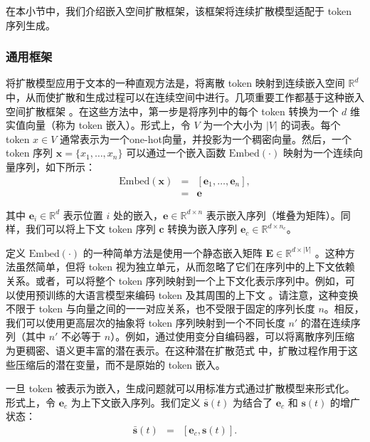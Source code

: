 \documentclass[UTF8,a4paper,zihao=-4,oneside,openany]{ctexbook}
\begin{document}
在本小节中，我们介绍嵌入空间扩散框架，该框架将连续扩散模型适配于 token 序列生成。

\subsubsection{通用框架}

将扩散模型应用于文本的一种直观方法是，将离散 token 映射到连续嵌入空间 $\mathbb{R}^d$ 中，从而使扩散和生成过程可以在连续空间中进行。几项重要工作都基于这种嵌入空间扩散框架 \citep{li-etal:2022diffusion,strudel-etal:2022self,gong-etal:2023diffuseq}。在这些方法中，第一步是将序列中的每个 token 转换为一个 $d$ 维实值向量（称为 token 嵌入）。形式上，令 $V$ 为一个大小为 $|V|$ 的词表。每个 token $x \in V$ 通常表示为一个one-hot向量，并投影为一个稠密向量。然后，一个 token 序列 $\mathbf{x} = \{x_1, \dots, x_n\}$ 可以通过一个嵌入函数 $\mathrm{Embed}(\cdot)$ 映射为一个连续向量序列，如下所示：
\begin{eqnarray}
\mathrm{Embed}(\mathbf{x}) & = & [\mathbf{e}_1,\dots,\mathbf{e}_n], \nonumber \\
& = & \mathbf{e}
\end{eqnarray}

\noindent 其中 $\mathbf{e}_i \in \mathbb{R}^d$ 表示位置 $i$ 处的嵌入，$\mathbf{e} \in \mathbb{R}^{d \times n}$ 表示嵌入序列（堆叠为矩阵）。同样，我们可以将上下文 token 序列 $\mathbf{c}$ 转换为嵌入序列 $\mathbf{e}_{c} \in \mathbb{R}^{d \times n_c}$。

定义 $\mathrm{Embed}(\cdot)$ 的一种简单方法是使用一个静态嵌入矩阵 $\mathbf{E} \in \mathbb{R}^{d \times |V|}$ \citep{mikolov-etal:2013efficient,mikolov-etal:2013distributed}。这种方法虽然简单，但将 token 视为独立单元，从而忽略了它们在序列中的上下文依赖关系。或者，可以将整个 token 序列映射到一个上下文化表示序列中。例如，可以使用预训练的大语言模型来编码 token 及其周围的上下文 \citep{devlin-etal:2019bert,brown-etal:2020language}。请注意，这种变换不限于 token 与向量之间的一一对应关系，也不受限于固定的序列长度 $n$。相反，我们可以使用更高层次的抽象将 token 序列映射到一个不同长度 $n'$ 的潜在连续序列（其中 $n'$ 不必等于 $n$）。例如，通过使用变分自编码器，可以将离散序列压缩为更稠密、语义更丰富的潜在表示。在这种潜在扩散范式 \citep{rombach-etal:2022high} 中，扩散过程作用于这些压缩后的潜在变量，而不是原始的 token 嵌入。

一旦 token 被表示为嵌入，生成问题就可以用标准方式通过扩散模型来形式化。形式上，令 $\mathbf{e}_c$ 为上下文嵌入序列。我们定义 $\bar{\mathbf{s}}(t)$ 为结合了 $\mathbf{e}_c$ 和 $\mathbf{s}(t)$ 的增广状态：
\begin{eqnarray}
\bar{\mathbf{s}}(t) & = & [\mathbf{e}_c, \mathbf{s}(t)].
\end{eqnarray}
\end{document}
